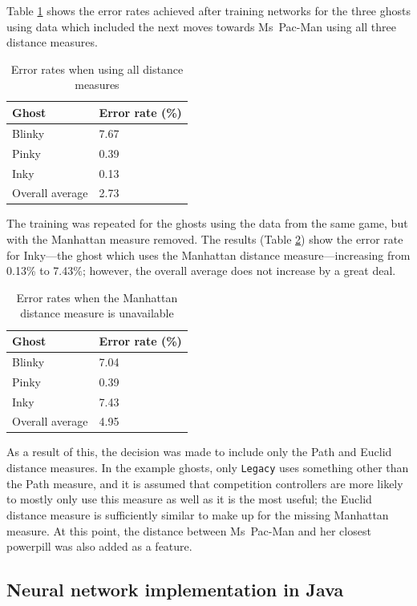 Table \ref{tab:alldm} shows the error rates achieved after training networks for the three ghosts using data which included the next moves towards Ms~Pac-Man using all three distance measures.

\begin{table}[ht]
\centering
\begin{tabular}{ll}
\toprule
Ghost & Error rate (\%) \\
\midrule
Blinky & 7.67 \\
Pinky & 0.39 \\
Inky & 0.13 \\
\midrule
Overall average & 2.73 \\
\bottomrule
\end{tabular}
\caption{Error rates when using all distance measures}
\label{tab:alldm}
\end{table}

The training was repeated for the ghosts using the data from the same game, but with the Manhattan measure removed.  The results (Table \ref{tab:withoutmanhattan}) show the error rate for Inky---the ghost which uses the Manhattan distance measure---increasing from 0.13\% to 7.43\%; however, the overall average does not increase by a great deal.

\begin{table}[ht]
\centering
\begin{tabular}{ll}
\toprule
Ghost & Error rate (\%) \\
\midrule
Blinky & 7.04 \\
Pinky & 0.39 \\
Inky & 7.43 \\
\midrule
Overall average & 4.95 \\
\bottomrule
\end{tabular}
\caption{Error rates when the Manhattan distance measure is unavailable}
\label{tab:withoutmanhattan}
\end{table}

As a result of this, the decision was made to include only the Path and Euclid distance measures.  In the example ghosts, only {\tt Legacy} uses something other than the Path measure, and it is assumed that competition controllers are more likely to mostly only use this measure as well as it is the most useful; the Euclid distance measure is sufficiently similar to make up for the missing Manhattan measure.  At this point, the distance between Ms~Pac-Man and her closest powerpill was also added as a feature.


\subsection{Neural network implementation in Java}

